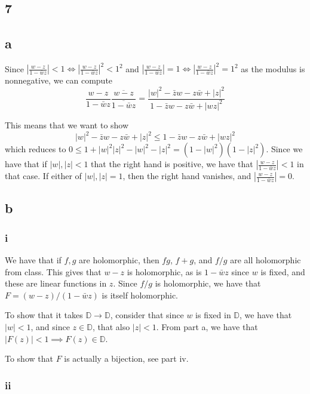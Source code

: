 \documentclass[12pt,letterpaper]{article}
\theoremstyle{definition}
\begin{document}
\subsection*{7}

\subsection*{a}

Since $\left| \frac{w-z}{1 - \bar{w}z} \right| < 1 \iff \left| \frac{w-z}{1 - \bar{w}z} \right|^2 < 1^2$ and $\left| \frac{w-z}{1 - \bar{w}z} \right| = 1 \iff \left| \frac{w-z}{1 - \bar{w}z} \right|^2 = 1^2$ as the modulus is nonnegative, we can compute
\[
  \frac{w - z}{1 - \bar{w}z} \frac{\overline{w - z}}{\overline{1 - \bar{w}z}} = \frac{|w|^2 - \bar{z}w - z\bar{w} + |z|^2}{1 -  \bar{z}w - z\bar{w} + |wz|^2}
\]

This means that we want to show
\[
  |w|^2 - \bar{z}w - z\bar{w} + |z|^2 \leq 1 -  \bar{z}w - z\bar{w} + |wz|^2
\]
which reduces to $0 \leq 1 + |w|^2|z|^2 - |w|^2 - |z|^2 = (1 - |w|^2)(1-|z|^2)$. Since we have that if $|w|, |z| < 1$ that the right hand is positive, we have that $\left|\frac{w-z}{1-\bar{w}z}\right| < 1$ in that case. If either of $|w|, |z| = 1$, then the right hand vanishes, and $\left|\frac{w-z}{1-\bar{w}z}\right| = 0$.

\subsection*{b}
\subsubsection*{i}

We have that if $f, g$ are holomorphic, then $fg$, $f + g$, and $f / g$ are all holomorphic from class. This gives that $w - z$ is holomorphic, as is $1 - \bar{w}z$ since $w$ is fixed, and these are linear functions in $z$. Since $f / g$ is holomorphic, we have that $F = (w- z) / (1 - \bar{w}z)$ is itself holomorphic.

To show that it takes $\mathbb{D} \rightarrow \mathbb{D}$, consider that since $w$ is fixed in $\mathbb{D}$, we have that $|w| < 1$, and since $z \in \mathbb{D}$, that also $|z| < 1$. From part a, we have that $|F(z)| < 1 \implies F(z) \in \mathbb{D}$. 

To show that $F$ is actually a bijection, see part iv.

\subsubsection*{ii}
\end{document}

